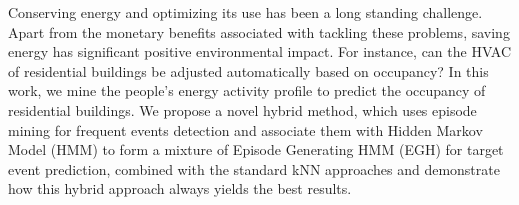 Conserving energy and optimizing its use has been a long standing challenge. 
Apart from the monetary benefits associated with tackling these problems, saving energy has significant positive environmental impact. 
For instance, can the HVAC of residential buildings be adjusted automatically based on occupancy? 
In this work, we mine the people's energy activity profile to predict the occupancy of residential buildings. We propose a novel hybrid method, which uses episode mining for frequent events detection and associate them with Hidden Markov Model (HMM) to form a mixture of Episode Generating HMM (EGH) for target event prediction, 
combined with the standard kNN approaches and demonstrate how this hybrid approach always yields the best results.
